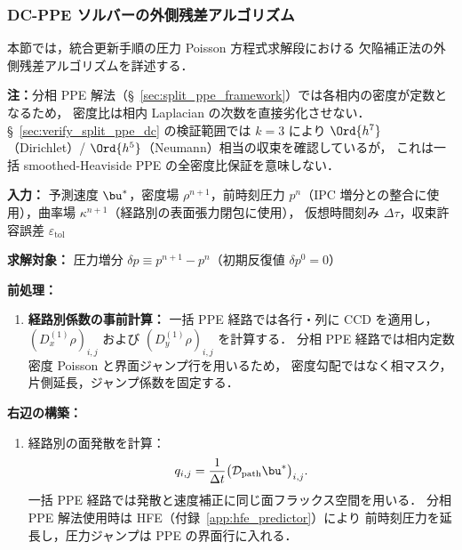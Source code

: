 
\subsubsection{DC-PPE ソルバーの外側残差アルゴリズム}
\label{app:dc_ppe_detail}

本節では，統合更新手順の圧力 Poisson 方程式求解段における
欠陥補正法の外側残差アルゴリズムを詳述する．

\noindent\textbf{注：}分相 PPE 解法（§~\ref{sec:split_ppe_framework}）では各相内の密度が定数となるため，
密度比は相内 Laplacian の次数を直接劣化させない．
§~\ref{sec:verify_split_ppe_dc} の検証範囲では $k{=}3$ により
$\Ord{h^7}$（Dirichlet）/ $\Ord{h^5}$（Neumann）相当の収束を確認しているが，
これは一括 smoothed-Heaviside PPE の全密度比保証を意味しない．

\textbf{入力：} 予測速度 $\bu^*$，密度場 $\rho^{n+1}$，前時刻圧力 $p^n$（IPC 増分との整合に使用），曲率場 $\kappa^{n+1}$（経路別の表面張力閉包に使用），
仮想時間刻み $\Delta\tau$，収束許容誤差 $\varepsilon_{\mathrm{tol}}$

\textbf{求解対象：} 圧力増分 $\delta p \equiv p^{n+1} - p^n$（初期反復値 $\delta p^0 = 0$）

\medskip
\textbf{前処理：}
\begin{enumerate}
  \item[(6.0)] \textbf{経路別係数の事前計算：}
  一括 PPE 経路では各行・列に CCD を適用し，
  $(D_x^{(1)}\rho)_{i,j}$ および $(D_y^{(1)}\rho)_{i,j}$ を計算する．
  分相 PPE 経路では相内定数密度 Poisson と界面ジャンプ行を用いるため，
  密度勾配ではなく相マスク，片側延長，ジャンプ係数を固定する．
\end{enumerate}

\textbf{右辺の構築：}
\begin{enumerate}
  \item[(6.1)] 経路別の面発散を計算：
  \[
    q_{i,j} = \frac{1}{\Delta t}\bigl(\mathcal{D}_{\mathrm{path}}\bu^*\bigr)_{i,j}.
  \]
  一括 PPE 経路では発散と速度補正に同じ面フラックス空間を用いる．
  分相 PPE 解法使用時は HFE（付録~\ref{app:hfe_predictor}）により
  前時刻圧力を延長し，圧力ジャンプは PPE の界面行に入れる．
\end{enumerate}

